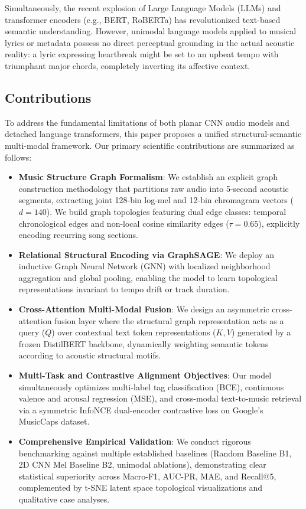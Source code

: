 \documentclass{article}
\begin{document}
Simultaneously, the recent explosion of Large Language Models (LLMs) and transformer encoders (e.g., BERT, RoBERTa) has revolutionized text-based semantic understanding. However, unimodal language models applied to musical lyrics or metadata possess no direct perceptual grounding in the actual acoustic reality: a lyric expressing heartbreak might be set to an upbeat tempo with triumphant major chords, completely inverting its affective context.

\subsection{Contributions}
To address the fundamental limitations of both planar CNN audio models and detached language transformers, this paper proposes a unified structural-semantic multi-modal framework. Our primary scientific contributions are summarized as follows:
\begin{itemize}
    \item \textbf{Music Structure Graph Formalism}: We establish an explicit graph construction methodology that partitions raw audio into 5-second acoustic segments, extracting joint 128-bin log-mel and 12-bin chromagram vectors ($d=140$). We build graph topologies featuring dual edge classes: temporal chronological edges and non-local cosine similarity edges ($\tau=0.65$), explicitly encoding recurring song sections.
    \item \textbf{Relational Structural Encoding via GraphSAGE}: We deploy an inductive Graph Neural Network (GNN) with localized neighborhood aggregation and global pooling, enabling the model to learn topological representations invariant to tempo drift or track duration.
    \item \textbf{Cross-Attention Multi-Modal Fusion}: We design an asymmetric cross-attention fusion layer where the structural graph representation acts as a query ($Q$) over contextual text token representations ($K, V$) generated by a frozen DistilBERT backbone, dynamically weighting semantic tokens according to acoustic structural motifs.
    \item \textbf{Multi-Task and Contrastive Alignment Objectives}: Our model simultaneously optimizes multi-label tag classification (BCE), continuous valence and arousal regression (MSE), and cross-modal text-to-music retrieval via a symmetric InfoNCE dual-encoder contrastive loss on Google's MusicCaps dataset.
    \item \textbf{Comprehensive Empirical Validation}: We conduct rigorous benchmarking against multiple established baselines (Random Baseline B1, 2D CNN Mel Baseline B2, unimodal ablations), demonstrating clear statistical superiority across Macro-F1, AUC-PR, MAE, and Recall@5, complemented by t-SNE latent space topological visualizations and qualitative case analyses.
\end{itemize}
\end{document}
